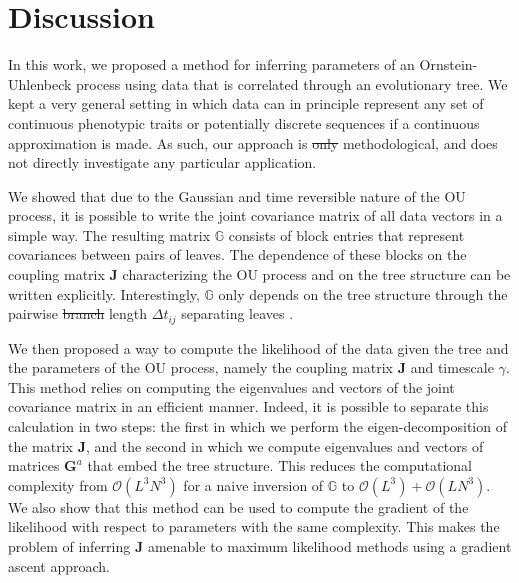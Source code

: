 \documentclass[preprint,amsmath,amssymb,superscriptaddress,showpacs,pre]{revtex4-1}
\providecommand{\DIFadd}[1]{{\protect\color{blue}\uwave{#1}}} %
\providecommand{\DIFdel}[1]{{\protect\color{red}\sout{#1}}}                      %
\providecommand{\DIFaddbegin}{} %
\providecommand{\DIFaddend}{} %
\providecommand{\DIFdelbegin}{} %
\providecommand{\DIFdelend}{} %
\newcommand{\DIFscaledelfig}{0.5}
\newlength{\DIFdelgraphicswidth} %
\newlength{\DIFdelgraphicsheight} %
\newcommand{\DIFaddincludegraphics}[2][]{{\color{blue}\fbox{\DIFOincludegraphics[#1]{#2}}}} %
\newcommand{\DIFdelincludegraphics}[2][]{%
\sbox{\DIFdelgraphicsbox}{\DIFOincludegraphics[#1]{#2}}%
\settoboxwidth{\DIFdelgraphicswidth}{\DIFdelgraphicsbox} %
\settoboxtotalheight{\DIFdelgraphicsheight}{\DIFdelgraphicsbox} %
\scalebox{\DIFscaledelfig}{%
\parbox[b]{\DIFdelgraphicswidth}{\usebox{\DIFdelgraphicsbox}\\[-\baselineskip] \rule{\DIFdelgraphicswidth}{0em}}\llap{\resizebox{\DIFdelgraphicswidth}{\DIFdelgraphicsheight}{%
\setlength{\unitlength}{\DIFdelgraphicswidth}%
\begin{picture}(1,1)%
\thicklines\linethickness{2pt} %
{\color[rgb]{1,0,0}\put(0,0){\framebox(1,1){}}}%
{\color[rgb]{1,0,0}\put(0,0){\line( 1,1){1}}}%
{\color[rgb]{1,0,0}\put(0,1){\line(1,-1){1}}}%
\end{picture}%
}\hspace*{3pt}}} %
} %
\DeclareRobustCommand{\DIFaddbegin}{\DIFOaddbegin \let\includegraphics\DIFaddincludegraphics} %
\DeclareRobustCommand{\DIFaddend}{\DIFOaddend \let\includegraphics\DIFOincludegraphics} %
\DeclareRobustCommand{\DIFdelbegin}{\DIFOdelbegin \let\includegraphics\DIFdelincludegraphics} %
\DeclareRobustCommand{\DIFdelend}{\DIFOaddend \let\includegraphics\DIFOincludegraphics} %
\begin{document}
  



\section{Discussion}
\label{sec:discussion}

In this work, we proposed a method for inferring parameters of an Ornstein-Uhlenbeck process using data that is correlated through an evolutionary tree. 
We kept a very general setting in which data can in principle represent any set of continuous phenotypic traits or potentially discrete sequences if a continuous approximation is made. 
As such, our approach is \DIFdelbegin \DIFdel{only }\DIFdelend \DIFaddbegin \DIFadd{purely }\DIFaddend methodological, and does not directly investigate any particular application. 

We showed that due to the Gaussian and time reversible nature of the OU process, it is possible to write the joint covariance matrix of all data vectors in a simple way. 
The resulting matrix $\mathbb{G}$ consists of block entries that represent covariances between pairs of leaves.
The dependence of these blocks on the coupling matrix $\bm{J}$ characterizing the OU process and on the tree structure can be written explicitly. 
Interestingly, $\mathbb{G}$ only depends on the tree structure through the pairwise \DIFdelbegin \DIFdel{branch }\DIFdelend \DIFaddbegin \DIFadd{path }\DIFaddend length $\Delta t_{ij}$ separating leaves \DIFaddbegin \DIFadd{along the tree}\DIFaddend .

We then proposed a way to compute the likelihood of the data given the tree and the parameters of the OU process, namely the coupling matrix $\mathbf{J}$ and timescale $\gamma$.
This method relies on computing the eigenvalues and vectors of the joint covariance matrix in an efficient manner. 
Indeed, it is possible to separate this calculation in two steps: the first in which we perform the eigen-decomposition of the matrix $\mathbf{J}$, and the second in which we compute eigenvalues and vectors of matrices $\mathbf{G}^a$ that embed the tree structure. 
This reduces the computational complexity from $\mathcal{O}(L^3N^3)$ for a naive inversion of $\mathbb{G}$ to $\mathcal{O}(L^3) + \mathcal{O}(LN^3)$. 
We also show that this method can be used to compute the gradient of the likelihood with respect to parameters with the same complexity.
This makes the problem of inferring $\mathbf{J}$ amenable to maximum likelihood methods using a gradient ascent approach. 
\end{document}
